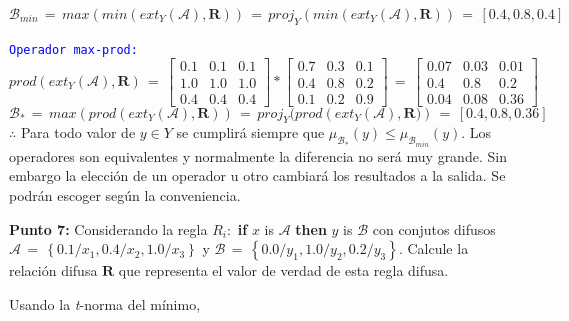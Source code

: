 \documentclass[10pt,onecolumn,twoside,letterpaper]{article}
\begin{document}
\begin{equation*}
  \label{eq:relmax}
  \mathcal{B}_{min}\,=\,max(min(ext_Y(\mathcal{A}),\mathbf{R}))\,=\,proj_Y\left(min(ext_Y(\mathcal{A}),\mathbf{R})\right)\,=\,\left[0.4,0.8,0.4\right]
\end{equation*}
\par \textcolor{blue}{\texttt{Operador max-prod:}} 
\begin{equation*}
  \label{eq:relation}
  prod(ext_Y(\mathcal{A}),\mathbf{R})\,=\,\left[
  \begin{array}{ccc}
    0.1&0.1&0.1\\
    1.0&1.0&1.0\\
    0.4&0.4&0.4
  \end{array}\right]*\left[
  \begin{array}{ccc}
    0.7&0.3&0.1\\
    0.4&0.8&0.2\\
    0.1&0.2&0.9
  \end{array}\right]\,=\,\left[
  \begin{array}{ccc}
    0.07&    0.03&    0.01\\
    0.4&   0.8&    0.2\\
    0.04&    0.08&    0.36
  \end{array}\right]
\end{equation*}
\begin{equation*}
  \label{eq:relmax}
  \mathcal{B}_*\,=\,max(prod(ext_Y(\mathcal{A}),\mathbf{R}))\,=\,proj_Y(prod\left(ext_Y(\mathcal{A}),\mathbf{R})\right)\,=\,\left[0.4,0.8,0.36\right]
\end{equation*}
$\therefore$ Para todo valor de $y\in Y$ se cumplir\'a siempre que $\mu_{\mathcal{B}_*}(y)\leq \mu_{\mathcal{B}_{min}}(y)$. Los operadores son equivalentes y normalmente la diferencia no ser\'a muy grande. Sin embargo la elecci\'on de un operador u otro cambiar\'a los resultados a la salida. Se podr\'an escoger seg\'un la conveniencia.  
\par{\bf \large Punto 7:} Considerando la  regla $R_i:$ \textbf{if} $x$ is $\mathcal{A}$ \textbf{then} $y$ is $\mathcal{B}$ con conjutos difusos $\mathcal{A}\,=\,\left\{0.1/x_1,0.4/x_2,1.0/x_3\right\}$ y $\mathcal{B}\,=\,\left\{0.0/y_1,1.0/y_2,0.2/y_3\right\}$. Calcule la relaci\'on difusa $\mathbf{R}$ que representa el valor de verdad de esta regla difusa.\\
\par Usando la \emph{t}-norma del m\'inimo,
\end{document}
